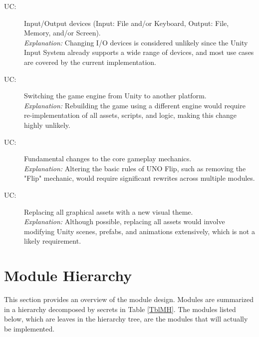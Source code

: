 \documentclass[12pt, titlepage]{article}
\newcounter{ucnum}
\newcommand{\uctheucnum}{UC\theucnum}
\begin{document}
\begin{description}
\item[ \uctheucnum \label{ucIO}:] Input/Output devices
  (Input: File and/or Keyboard, Output: File, Memory, and/or Screen). \\
  \textit{Explanation:} Changing I/O devices is considered unlikely since the Unity Input System already supports a wide range of devices, and most use cases are covered by the current implementation.

\item[ \uctheucnum \label{ucEngine}:] Switching the game engine from Unity to another platform. \\
  \textit{Explanation:} Rebuilding the game using a different engine would require re-implementation of all assets, scripts, and logic, making this change highly unlikely.

\item[ \uctheucnum \label{ucMechanics}:] Fundamental changes to the core gameplay mechanics. \\
  \textit{Explanation:} Altering the basic rules of UNO Flip, such as removing the "Flip" mechanic, would require significant rewrites across multiple modules.

\item[ \uctheucnum \label{ucAssets}:] Replacing all graphical assets with a new visual theme. \\
  \textit{Explanation:} Although possible, replacing all assets would involve modifying Unity scenes, prefabs, and animations extensively, which is not a likely requirement.
\end{description}


\section{Module Hierarchy} \label{SecMH}

This section provides an overview of the module design. Modules are summarized
in a hierarchy decomposed by secrets in Table \ref{TblMH}. The modules listed
below, which are leaves in the hierarchy tree, are the modules that will
actually be implemented.
\end{document}
